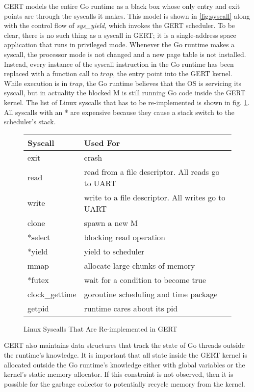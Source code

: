 GERT models the entire Go runtime as a black box whose only entry and exit points
are through the syscalls it makes. This model is shown in \ref{fig:syscall} along with the
control flow of \textit{sys\_yield}, which invokes the GERT scheduler. To be clear, there is no such thing as a syscall in GERT;
it is a single-address space application that runs in privileged mode.
Whenever the Go runtime makes a syscall, the processor mode is not changed and a new page table
is not installed. Instead, every instance of the syscall instruction in the Go runtime has been
replaced with a function call to $trap$, the entry point into the GERT kernel.
While execution is in $trap$, the Go runtime believes
that the OS is servicing its syscall, but in actuality the blocked M is still running Go code inside
the GERT kernel. The list of Linux syscalls that has to be re-implemented is shown in fig. \ref{fig:syscalls}.
All syscalls with an * are expensive because they cause a stack switch to the scheduler's stack.


\begin{figure} [h]
\begin{center}
  \begin{tabular}{ | l | l |}
    \hline
    Syscall & Used For \\ \hline
    exit & crash \\ \hline
    read & read from a file descriptor. All reads go to UART\\ \hline
    write & write to a file descriptor. All writes go to UART\\ \hline
    clone & spawn a new M\\ \hline
    *select & blocking read operation\\ \hline
    *yield & yield to scheduler\\ \hline
    mmap & allocate large chunks of memory\\ \hline
    *futex & wait for a condition to become true\\ \hline
    clock\_gettime & goroutine scheduling and time package\\ \hline
    getpid & runtime cares about its pid\\
  \end{tabular}
\end{center}
  \caption{Linux Syscalls That Are Re-implemented in GERT}  \label{fig:syscalls}
\end{figure}

GERT also maintains data structures that track the state of Go threads
outside the runtime's knowledge. It is important that all state inside the GERT kernel is
allocated outside the Go runtime's knowledge either with global variables or the kernel's
static memory allocator. If this constraint is not observed, then it is possible for the garbage collector
to potentially recycle memory from the kernel.

